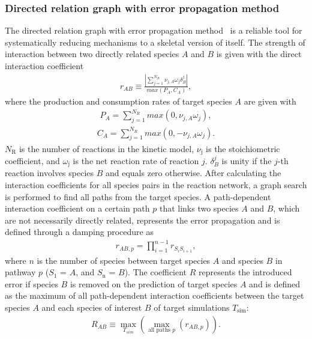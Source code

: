\begin{refsection}
\subsubsection{Directed relation graph with error propagation method}
The directed relation graph with error propagation method~\cite{PepiotDesjardins2008a} is a reliable tool for systematically reducing mechanisms to a skeletal version of itself. The strength of interaction between two directly related species $A$ and $B$ is given with the direct interaction coefficient
\begin{align}
r_{AB} \equiv \frac{|\sum_{j=1}^{N_R} \nu_{j,A}\omega_j\delta_{B}^{j}|}{max(P_A, C_A)},
\end{align}
where the production and consumption rates of target species $A$ are given with
\begin{align}
\label{eq:B1bProductionRate}
P_A = \sum_{j=1}^{N_R} max(0, \nu_{j,A}\omega_j),
\end{align}
\begin{align}
\label{eq:B1bConsumptionRate}
C_A = \sum_{j=1}^{N_R} max(0, -\nu_{j,A}\omega_j).
\end{align}
$N_\mathrm{R}$ is the number of reactions in the kinetic model, $\nu_\mathrm{j}$ is the stoichiometric coefficient, and $\omega_\mathrm{j}$ is the net reaction rate of reaction $j$. $\delta_{B}^{j}$ is unity if the $j$-th reaction involves species $B$ and equals zero otherwise. After calculating the interaction coefficients for all species pairs in the reaction network, a graph search is performed to find all paths from the target species. A path-dependent interaction coefficient on a certain path $p$ that links two species $A$ and $B$, which are not necessarily directly related, represents the error propagation and is defined through a damping procedure as
\begin{align}
r_{AB,p} = \prod_{i=1}^{n-1} r_{S_iS_{i+1}},
\end{align}
where $n$ is the number of species between target species $A$ and species $B$ in pathway $p$ ($S_\mathrm{1}$ = $A$, and $S_\mathrm{n}$ = $B$). The coefficient $R$ represents the introduced error if species $B$ is removed on the prediction of target species $A$ and is defined as the maximum of all path-dependent interaction coefficients between the target species $A$ and each species of interest $B$ of target simulations $T_\mathrm{sim}$:
\begin{align}
R_{AB} \equiv \mathop{max}_{T_{sim}} (\mathop{max}_{\text{all paths } p} (r_{AB,p})).
\end{align}

\end{refsection}
